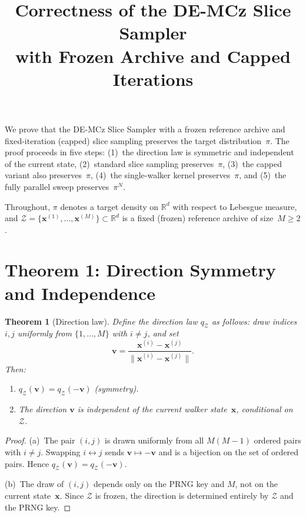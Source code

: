\documentclass[12pt]{article}
\title{Correctness of the DE-MCz Slice Sampler\\with Frozen Archive and Capped Iterations}
\author{}
\date{}
\newtheorem{theorem}{Theorem}
\newcommand{\R}{\mathbb{R}}
\newcommand{\Zmat}{\mathcal{Z}}
\newcommand{\bx}{\mathbf{x}}
\newcommand{\bv}{\mathbf{v}}
\begin{document}
\maketitle

We prove that the DE-MCz Slice Sampler with a frozen reference archive
and fixed-iteration (capped) slice sampling preserves the target
distribution~$\pi$. The proof proceeds in five steps: (1)~the direction
law is symmetric and independent of the current state, (2)~standard
slice sampling preserves~$\pi$, (3)~the capped variant also
preserves~$\pi$, (4)~the single-walker kernel preserves~$\pi$, and
(5)~the fully parallel sweep preserves~$\pi^N$.

Throughout, $\pi$ denotes a target density on $\R^d$ with respect to
Lebesgue measure, and $\Zmat = \{\bx^{(1)}, \ldots, \bx^{(M)}\}
\subset \R^d$ is a fixed (frozen) reference archive of size~$M \geq 2$.

\section*{Theorem 1: Direction Symmetry and Independence}

\begin{theorem}[Direction law]
\label{thm:direction}
Define the direction law $q_\Zmat$ as follows: draw indices $i, j$
uniformly from $\{1, \ldots, M\}$ with $i \neq j$, and set
\[
    \bv = \frac{\bx^{(i)} - \bx^{(j)}}{\|\bx^{(i)} - \bx^{(j)}\|}.
\]
Then:
\begin{enumerate}
    \item[(a)] $q_\Zmat(\bv) = q_\Zmat(-\bv)$  \quad (symmetry).
    \item[(b)] The direction $\bv$ is independent of the current walker
    state~$\bx$, conditional on $\Zmat$.
\end{enumerate}
\end{theorem}

\begin{proof}
(a)~The pair $(i, j)$ is drawn uniformly from all $M(M-1)$ ordered
pairs with $i \neq j$. Swapping $i \leftrightarrow j$ sends $\bv
\mapsto -\bv$ and is a bijection on the set of ordered pairs. Hence
$q_\Zmat(\bv) = q_\Zmat(-\bv)$.

(b)~The draw of $(i, j)$ depends only on the PRNG key and $M$, not on
the current state~$\bx$. Since $\Zmat$ is frozen, the direction is
determined entirely by $\Zmat$ and the PRNG key.
\end{proof}
\end{document}
